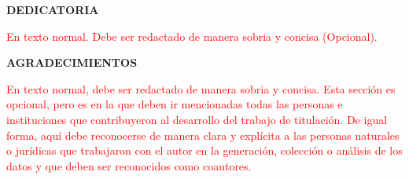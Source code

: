 \IfFileExists{IEEEtran.cls}{\documentclass[journal]{IEEEtran}}{\documentclass[twocolumn]{article}}
\begin{document}
\newpage

\begin{center}
\textbf{\fontsize{14}{16}\selectfont DEDICATORIA}\\
\end{center}
\vspace{10pt}

{
\setlength{\parindent}{3em}
\hspace{1pt}
\fontsize{12}{14}\selectfont 

\textcolor{red}{En texto normal. Debe ser redactado de manera sobria y concisa (Opcional).}

}
\newpage


\begin{center}
\textbf{\fontsize{14}{16}\selectfont AGRADECIMIENTOS}\\
\end{center}
\vspace{10pt}
\fontsize{12}{14}\selectfont 

{
\setlength{\parindent}{3em}
\hspace{1pt}

\textcolor{red}{En texto normal, debe ser redactado de manera sobria y concisa. Esta sección es opcional, pero es en la que deben ir mencionadas todas las personas e instituciones que contribuyeron al desarrollo del trabajo de titulación. De igual forma, aquí debe reconocerse de manera clara y explícita a las personas naturales o jurídicas que trabajaron con el autor en la generación, colección o análisis de los datos y que deben ser reconocidos como coautores.}


}
\newpage
\end{document}

